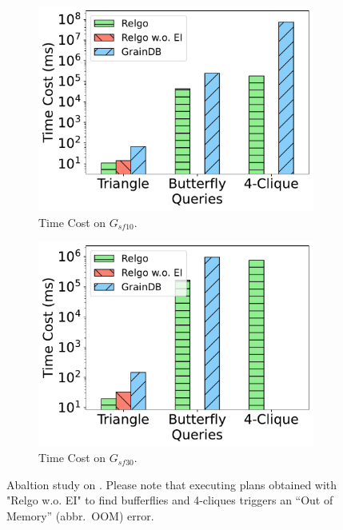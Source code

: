 \begin{figure}[ht]
    \centering
    \begin{subfigure}[b]{.45\linewidth}
        \centering
        \includegraphics[width=\linewidth]{./figures/exp/ablation_ei_sf10.pdf}
        \caption{Time Cost on $G_{sf10}$.}
        \label{fig:exp-ablation-ei-sf10}
    \end{subfigure}
    \begin{subfigure}[b]{0.45\linewidth}
        \centering
        \includegraphics[width=\linewidth]{./figures/exp/ablation_ei_sf30.pdf}
        \caption{Time Cost on $G_{sf30}$.}
        \label{fig:exp-ablation-ei-sf30}
    \end{subfigure}
    \caption{Abaltion study on \expandintersectrule. Please note that executing plans obtained with "Relgo w.o. EI" to find bufferflies and 4-cliques triggers an ``Out of Memory'' (abbr.~OOM) error.}
    \label{fig:exp-ablation-ei}
\end{figure}

